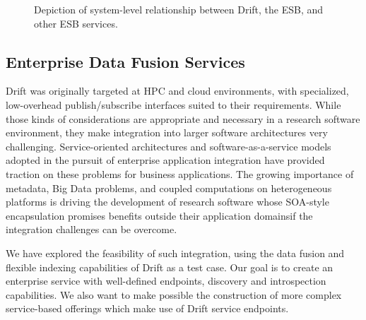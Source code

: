 \begin{figure}
\caption{Depiction of system-level relationship between Drift, the ESB, and other ESB services.}
\label{fig:eph}
\end{figure}

\subsection{Enterprise Data Fusion Services}


Drift was originally targeted at HPC and cloud environments, with specialized, low-overhead
publish/subscribe interfaces suited to their requirements.  While those kinds of considerations are
appropriate and necessary in a research software environment, they make integration into larger software
architectures very challenging.  Service-oriented architectures and software-as-a-service models adopted
in the pursuit of enterprise application integration have provided traction on these problems for
business applications.  The growing importance of metadata, Big Data problems, and coupled computations
on heterogeneous platforms is driving the development of research software whose SOA-style encapsulation
promises benefits outside their application domains\textemdash{}if the integration challenges can be
overcome.

We have explored the feasibility of such integration, using the data fusion and flexible indexing
capabilities of Drift as a test case. Our goal is to create an enterprise service with well-defined
endpoints, discovery and introspection capabilities.  We also want to make possible the construction of
more complex service-based offerings which make use of Drift service endpoints.

